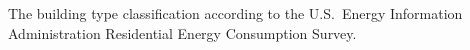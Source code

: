 The building type classification according to the U.S.~Energy Information Administration Residential Energy Consumption Survey.

